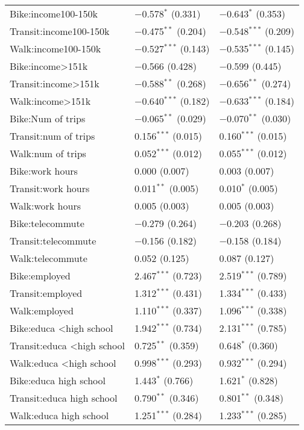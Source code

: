 \begin{longtabu}{lll}
 Bike:income100-150k & $-$0.578$^{*}$ (0.331) & $-$0.643$^{*}$ (0.353) \\ 
 Transit:income100-150k & $-$0.475$^{**}$ (0.204) & $-$0.548$^{***}$ (0.209) \\ 
 Walk:income100-150k & $-$0.527$^{***}$ (0.143) & $-$0.535$^{***}$ (0.145) \\ 
 Bike:income\textgreater 151k & $-$0.566 (0.428) & $-$0.599 (0.445) \\ 
 Transit:income\textgreater 151k & $-$0.588$^{**}$ (0.268) & $-$0.656$^{**}$ (0.274) \\ 
 Walk:income\textgreater 151k & $-$0.640$^{***}$ (0.182) & $-$0.633$^{***}$ (0.184) \\ 
 Bike:Num of trips & $-$0.065$^{**}$ (0.029) & $-$0.070$^{**}$ (0.030) \\ 
 Transit:num of trips & 0.156$^{***}$ (0.015) & 0.160$^{***}$ (0.015) \\ 
 Walk:num of trips & 0.052$^{***}$ (0.012) & 0.055$^{***}$ (0.012) \\ 
 Bike:work hours & 0.000 (0.007) & 0.003 (0.007) \\ 
 Transit:work hours & 0.011$^{**}$ (0.005) & 0.010$^{*}$ (0.005) \\ 
 Walk:work hours & 0.005 (0.003) & 0.005 (0.003) \\ 
 Bike:telecommute & $-$0.279 (0.264) & $-$0.203 (0.268) \\ 
 Transit:telecommute & $-$0.156 (0.182) & $-$0.158 (0.184) \\ 
 Walk:telecommute & 0.052 (0.125) & 0.087 (0.127) \\ 
 Bike:employed & 2.467$^{***}$ (0.723) & 2.519$^{***}$ (0.789) \\ 
 Transit:employed & 1.312$^{***}$ (0.431) & 1.334$^{***}$ (0.433) \\ 
 Walk:employed & 1.110$^{***}$ (0.337) & 1.096$^{***}$ (0.338) \\ 
 Bike:educa \textless high school & 1.942$^{***}$ (0.734) & 2.131$^{***}$ (0.785) \\ 
 Transit:educa \textless high school & 0.725$^{**}$ (0.359) & 0.648$^{*}$ (0.360) \\ 
 Walk:educa \textless high school & 0.998$^{***}$ (0.293) & 0.932$^{***}$ (0.294) \\ 
 Bike:educa high school & 1.443$^{*}$ (0.766) & 1.621$^{*}$ (0.828) \\ 
 Transit:educa high school & 0.790$^{**}$ (0.346) & 0.801$^{**}$ (0.348) \\ 
 Walk:educa high school & 1.251$^{***}$ (0.284) & 1.233$^{***}$ (0.285) \\ 

\end{longtabu}
